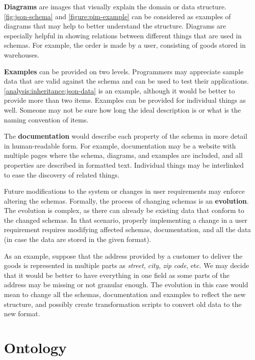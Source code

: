 \textbf{Diagrams} are images that visually explain the domain or data structure. \autoref{fig:json-schema} and \ref{figure:pim-example} can be considered as examples of diagrams that may help to better understand the structure. Diagrams are especially helpful in showing relations between different things that are used in schemas. For example, the order is made by a user, consisting of goods stored in warehouses.

\textbf{Examples} can be provided on two levels. Programmers may appreciate sample data that are valid against the schema and can be used to test their applications. \autoref{analysis:inheritance:json-data} is an example, although it would be better to provide more than two items. Examples can be provided for individual things as well. Someone may not be sure how long the ideal description is or what is the naming convention of items.

The \textbf{documentation} would describe each property of the schema in more detail in human-readable form. For example, documentation may be a website with multiple pages where the schema, diagrams, and examples are included, and all properties are described in formatted text. Individual things may be interlinked to ease the discovery of related things.

\bigskip

Future modifications to the system or changes in user requirements may enforce altering the schemas. Formally, the process of changing schemas is an \textbf{evolution}. The evolution is complex, as there can already be existing data that conform to the changed schemas. In that scenario, properly implementing a change in a user requirement requires modifying affected schemas, documentation, and all the data (in case the data are stored in the given format).

\begin{showcase}
    As an example, suppose that the address provided by a customer to deliver the goods is represented in multiple parts as \textit{street}, \textit{city}, \textit{zip code}, etc. We may decide that it would be better to have everything in one field as some parts of the address may be missing or not granular enough. The evolution in this case would mean to change all the schemas, documentation and examples to reflect the new structure, and possibly create transformation scripts to convert old data to the new format.
\end{showcase}

\section*{Ontology}

